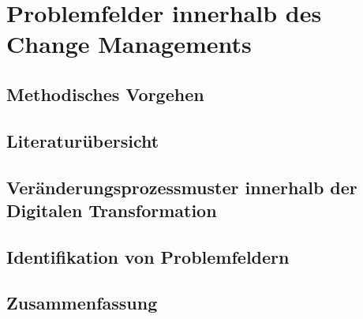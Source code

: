 \chapter{Problemfelder innerhalb des Change Managements}
\label{problemfields}

\todots

\section{Methodisches Vorgehen}

\todots

\section{Literaturübersicht}

\todots

\section{Veränderungsprozessmuster innerhalb der Digitalen Transformation}

\todots

\section{Identifikation von Problemfeldern}

\todots

\section{Zusammenfassung}


